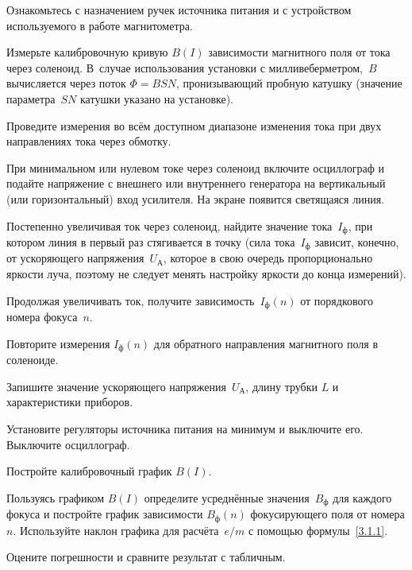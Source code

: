 \begin{lab:task}

    
\item Ознакомьтесь с назначением ручек источника питания и с устройством 
    используемого в работе магнитометра. 
    
\item Измерьте калибровочную кривую $B(I)$ зависимости магнитного поля
от тока через соленоид. В~случае использования установки с
милливеберметром,~$B$ вычисляется через поток $\Phi=BSN$, пронизывающий пробную
катушку (значение параметра~$SN$ катушки указано на установке).

Проведите измерения во всём доступном диапазоне изменения тока при двух
направлениях тока через обмотку.

\item При минимальном или нулевом токе через соленоид включите осциллограф и
подайте напряжение с внешнего или внутреннего генератора на вертикальный (или
горизонтальный) вход усилителя. На экране появится светящаяся линия.

\item Постепенно увеличивая ток через соленоид, найдите значение тока~$I_ф$, при
котором линия в первый раз стягивается в точку (сила тока~$I_ф$ зависит,
конечно, от ускоряющего напряжения~$U_А$, которое в свою очередь пропорционально 
яркости луча, поэтому не следует менять настройку яркости до конца измерений).

Продолжая увеличивать ток, получите зависимость~$I_ф(n)$ от порядкового номера
фокуса~$n$.

\item Повторите измерения $I_ф(n)$ для обратного направления магнитного поля
в соленоиде.

\item Запишите значение ускоряющего напряжения~$U_А$, длину трубки
$L$ и характеристики приборов.

\item Установите регуляторы источника питания на минимум и выключите его. 
Выключите осциллограф.


\item Постройте калибровочный график $B(I)$.

\item Пользуясь графиком $B(I)$ определите усреднённые значения~$B_ф$ для каждого
фокуса и постройте график зависимости $B_ф(n)$ фокусирующего поля от номера $n$. 
Используйте наклон графика для расчёта~$e/m$ с помощью формулы~\eqref{3.1.1}.

\item Оцените погрешности и сравните результат с табличным.

\end{lab:task}


